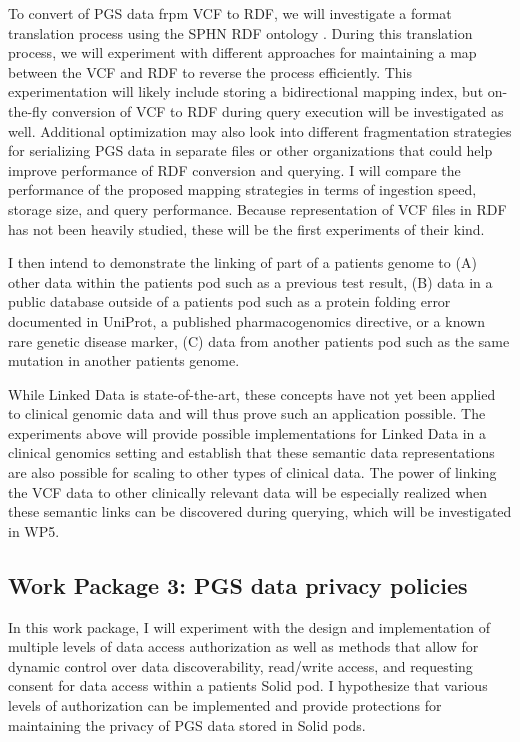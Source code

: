 \documentclass[runningheads]{llncs}
\begin{document}
To convert of PGS data frpm VCF to RDF, we will investigate a format translation process using the SPHN RDF ontology \cite{van_der_horst_bridging_2023}. 
During this translation process, we will experiment with different approaches for maintaining a map between the VCF and RDF to reverse the process efficiently. 
This experimentation will likely include storing a bidirectional mapping index, but on-the-fly conversion of VCF to RDF during query execution will be investigated as well. 
Additional optimization may also look into different fragmentation strategies for serializing PGS data in separate files or other organizations that could help improve performance of RDF conversion and querying.
I will compare the performance of the proposed mapping strategies in terms of ingestion speed, storage size, and query performance. 
Because representation of VCF files in RDF has not been heavily studied, these will be the first experiments of their kind.

I then intend to demonstrate the linking of part of a patient\textquotesingle s genome to
(A) other data within the patient\textquotesingle s pod such as a previous test result, 
(B) data in a public database outside of a patient\textquotesingle s pod such as a protein folding error documented in UniProt, a published pharmacogenomics directive, or a known rare genetic disease marker,
(C) data from another patient\textquotesingle s pod such as the same mutation in another patient\textquotesingle s genome.

While Linked Data is state-of-the-art, these concepts have not yet been applied to clinical genomic data and will thus prove such an application possible. 
The experiments above will provide possible implementations for Linked Data in a clinical genomics setting and establish that these semantic data representations are also possible for scaling to other types of clinical data.
The power of linking the VCF data to other clinically relevant data will be especially realized when these semantic links can be discovered during querying, which will be investigated in WP5. 


\subsection{Work Package 3: PGS data privacy policies}

In this work package, I will experiment with the design and implementation of multiple levels of data access authorization as well as methods that allow for dynamic control over data discoverability, read/write access, and requesting consent for data access within a patient\textquotesingle s Solid pod. 
I hypothesize that various levels of authorization can be implemented and provide protections for maintaining the privacy of PGS data stored in Solid pods.
\end{document}
